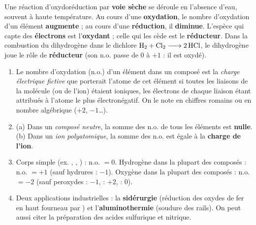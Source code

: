 \documentclass[11pt]{article}
\newcommand{\cle}[1]{{\popxbold\color{popdark}#1}}
\begin{document}
\begin{corrige}
Une réaction d'oxydoréduction par \textbf{voie sèche} se déroule en l'absence d'eau, souvent à haute température. Au cours d'une \textbf{oxydation}, le nombre d'oxydation d'un élément \textbf{augmente} ; au cours d'une \textbf{réduction}, il \textbf{diminue}. L'espèce qui capte des \textbf{électrons} est l'\textbf{oxydant} ; celle qui les cède est le \textbf{réducteur}. Dans la combustion du dihydrogène dans le dichlore $\ce{H2 + Cl2 -> 2 HCl}$, le dihydrogène joue le rôle de \textbf{réducteur} (son n.o. passe de $0$ à $+1$ : il est oxydé).
\end{corrige}

\begin{corrige}
\begin{enumerate}
\item Le \cle{nombre d'oxydation} (n.o.) d'un élément dans un composé est la \emph{charge électrique fictive} que porterait l'atome de cet élément si toutes les liaisons de la molécule (ou de l'ion) étaient ioniques, les électrons de chaque liaison étant attribués à l'atome le plus électronégatif. On le note en chiffres romains ou en nombre algébrique ($+2$, $-1$\ldots).
\item (a) Dans un \emph{composé neutre}, la somme des n.o. de tous les éléments est \textbf{nulle}. (b) Dans un \emph{ion polyatomique}, la somme des n.o. est égale à la \textbf{charge de l'ion}.
\item Corps simple (ex. , , ) : n.o. $= 0$. Hydrogène dans la plupart des composés : n.o. $= +1$ (sauf hydrures : $-1$). Oxygène dans la plupart des composés : n.o. $= -2$ (sauf peroxydes : $-1$,  : $+2$,  : $0$).
\item Deux applications industrielles : la \textbf{sidérurgie} (réduction des oxydes de fer en haut fourneau par ) et l'\textbf{aluminothermie} (soudure des rails). On peut aussi citer la préparation des acides sulfurique et nitrique.
\end{enumerate}
\end{corrige}
\end{document}
